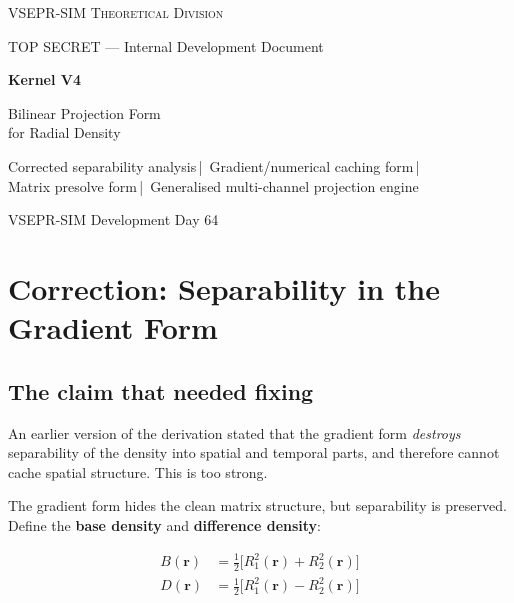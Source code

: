 \documentclass[11pt, a4paper, oneside]{article}
\newcommand{\Ri}[1]{R_{#1}^2(\mathbf{r})}          %
\newcommand{\Bvec}{B(\mathbf{r})}
\newcommand{\Dvec}{D(\mathbf{r})}
\begin{document}
\begin{titlepage}
  \centering
  \vspace*{1.2cm}
  {\large\scshape VSEPR-SIM Theoretical Division\par}
  \vspace{0.3cm}
  {\small TOP SECRET — Internal Development Document\par}
  \vspace{1.2cm}
  {\Huge\bfseries Kernel V4\par}
  \vspace{0.4cm}
  {\LARGE Bilinear Projection Form\\[0.2em]
   for Radial Density\par}
  \vspace{1.2cm}
  {\normalsize
	Corrected separability analysis\,|\,
	Gradient/numerical caching form\,|\,\\[0.3em]
	Matrix presolve form\,|\,
	Generalised multi-channel projection engine\par}
  \vspace{1.5cm}
  {\normalsize VSEPR-SIM Development Day 64\par}
\end{titlepage}

\tableofcontents
\newpage

\section{Correction: Separability in the Gradient Form}
\label{sec:correction}

\subsection{The claim that needed fixing}

An earlier version of the derivation stated that the gradient form
\emph{destroys} separability of the density into spatial and temporal
parts, and therefore cannot cache spatial structure. This is too strong.

The gradient form hides the clean matrix structure, but separability
is preserved. Define the \textbf{base density} and \textbf{difference density}:

\begin{align}
  \Bvec &= \tfrac{1}{2}\bigl[\Ri{1} + \Ri{2}\bigr]
  \label{eq:B} \\[4pt]
  \Dvec &= \tfrac{1}{2}\bigl[\Ri{1} - \Ri{2}\bigr]
  \label{eq:D}
\end{align}
\end{document}

